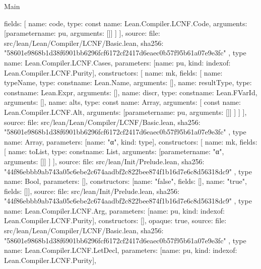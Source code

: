 \begin{lexlean}{Main}
\begin{toolingmodule}
{{{          fields: [
            {
              name: code,
              type: const{
                name: Lean.Compiler.LCNF.Code,
                arguments: [parameter{name: pu, arguments: []}]
              }
            }
          ]
        }
      ],
      source: {
        file: src/lean/Lean/Compiler/LCNF/Basic.lean,
        sha256: "58601e9868b1d38f6901bb6296fcf6172cf2417d6eaec0b57f95b61a07e9e3fc"
      }
    },
    type{
      name: Lean.Compiler.LCNF.Cases,
      parameters: [{name: pu, kind: index{of: Lean.Compiler.LCNF.Purity}}],
      constructors: [
        {
          name: mk,
          fields: [
            {name: typeName, type: const{name: Lean.Name, arguments: []}},
            {name: resultType, type: const{name: Lean.Expr, arguments: []}},
            {name: discr, type: const{name: Lean.FVarId, arguments: []}},
            {
              name: alts,
              type: const{
                name: Array,
                arguments: [
                  const{
                    name: Lean.Compiler.LCNF.Alt,
                    arguments: [parameter{name: pu, arguments: []}]
                  }
                ]
              }
            }
          ]
        }
      ],
      source: {
        file: src/lean/Lean/Compiler/LCNF/Basic.lean,
        sha256: "58601e9868b1d38f6901bb6296fcf6172cf2417d6eaec0b57f95b61a07e9e3fc"
      }
    },
    type{
      name: Array,
      parameters: [{name: "α", kind: type{}}],
      constructors: [
        {
          name: mk,
          fields: [
            {
              name: toList,
              type: const{name: List, arguments: [parameter{name: "α", arguments: []}]}
            }
          ]
        }
      ],
      source: {
        file: src/lean/Init/Prelude.lean,
        sha256: "44f86ebbb9ab743a05c6ebe2c674aadbf2c822bee874f1b16d7e6c8d56318dc9"
      }
    },
    type{
      name: Bool,
      parameters: [],
      constructors: [{name: "false", fields: []}, {name: "true", fields: []}],
      source: {
        file: src/lean/Init/Prelude.lean,
        sha256: "44f86ebbb9ab743a05c6ebe2c674aadbf2c822bee874f1b16d7e6c8d56318dc9"
      }
    },
    type{
      name: Lean.Compiler.LCNF.Arg,
      parameters: [{name: pu, kind: index{of: Lean.Compiler.LCNF.Purity}}],
      constructors: [],
      opaque: true,
      source: {
        file: src/lean/Lean/Compiler/LCNF/Basic.lean,
        sha256: "58601e9868b1d38f6901bb6296fcf6172cf2417d6eaec0b57f95b61a07e9e3fc"
      }
    },
    type{
      name: Lean.Compiler.LCNF.LetDecl,
      parameters: [{name: pu, kind: index{of: Lean.Compiler.LCNF.Purity}}],
}}
\end{toolingmodule}
\end{lexlean}
